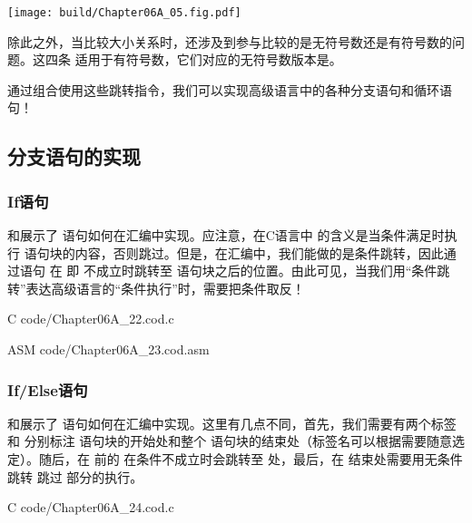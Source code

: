 \begin{Figure}
    \texttt{[image: build/Chapter06A\_05.fig.pdf]}
\end{Figure}

除此之外，当比较大小关系时，还涉及到参与比较的是无符号数还是有符号数的问题。这四条 适用于有符号数，它们对应的无符号数版本是。

通过组合使用这些跳转指令，我们可以实现高级语言中的各种分支语句和循环语句！

\subsection{分支语句的实现}

\subsubsection{If语句}
和展示了 语句如何在汇编中实现。应注意，在C语言中 的含义是当条件满足时执行 语句块的内容，否则跳过。但是，在汇编中，我们能做的是条件跳转，因此通过语句 在 即 不成立时跳转至 语句块之后的位置。由此可见，当我们用“条件跳转”表达高级语言的“条件执行”时，需要把条件取反！

\begin{Code}{C}
    code/Chapter06A_22.cod.c
\end{Code}

\begin{Code}{ASM}
    code/Chapter06A_23.cod.asm
\end{Code}

\subsubsection{If/Else语句}
和展示了 语句如何在汇编中实现。这里有几点不同，首先，我们需要有两个标签 和 分别标注 语句块的开始处和整个 语句块的结束处（标签名可以根据需要随意选定）。随后，在 前的 在条件不成立时会跳转至 处，最后，在 结束处需要用无条件跳转 跳过 部分的执行。

\begin{Code}{C}
    code/Chapter06A_24.cod.c
\end{Code}

